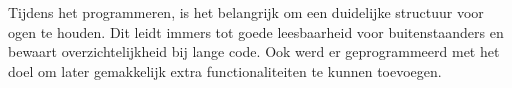 \\
\\
Tijdens het programmeren, is het belangrijk om een duidelijke structuur voor ogen te houden. Dit leidt immers tot goede leesbaarheid voor buitenstaanders en bewaart overzichtelijkheid bij lange code. Ook werd er geprogrammeerd met het doel om later gemakkelijk extra functionaliteiten te kunnen toevoegen.


